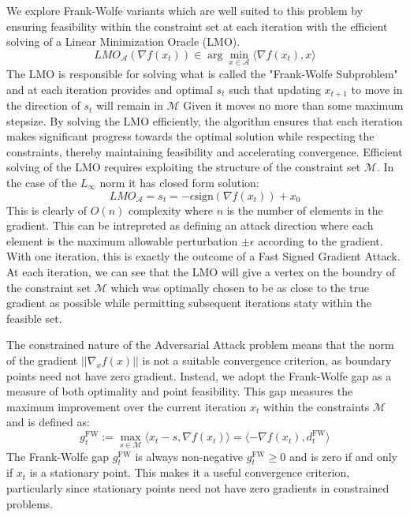 \documentclass{article}
\begin{document}
We explore Frank-Wolfe variants which are well suited to this problem by ensuring feasibility within the constraint set at each iteration with the efficient solving of a Linear Minimization Oracle (LMO). 
$$
LMO_\mathcal{A}(\nabla f(x_t)) \in \arg \min_{x \in \mathcal{A}} \langle \nabla f(x_t), x\rangle
$$
The LMO is responsible for solving what is called the "Frank-Wolfe Subproblem" and at each iteration provides and optimal $s_t$ such that updating $x_{t+1}$ to move in the direction of $s_t$ will remain in $\mathcal{M}$ Given it moves no more than some maximum stepsize. By solving the LMO efficiently, the algorithm ensures that each iteration makes significant progress towards the optimal solution while respecting the constraints, thereby maintaining feasibility and accelerating convergence. 
Efficient solving of the LMO requires exploiting the structure of the constraint set $\mathcal{M}$. In the case of the $L_\infty$ norm it has closed form solution:
$$LMO_\mathcal{A} = s_t = -\epsilon \text{sign}(\nabla f(x_t)) + x_0$$
This is clearly of $O(n)$ complexity where $n$ is the number of elements in the gradient. This can be intrepreted as defining an attack direction where each element is the maximum allowable perturbation $\pm \epsilon$ according to the gradient. With one iteration, this is exactly the outcome of a Fast Signed Gradient Attack. At each iteration, we can see that the LMO will give a vertex on the boundry of the constraint set $\mathcal{M}$ which was optimally chosen to be as close to the true gradient as possible while permitting subsequent iterations staty within the feasible set.


The constrained nature of the Adversarial Attack problem means that the norm of the gradient $||\nabla_x f(x)||$ is not a suitable convergence criterion, as boundary points need not have zero gradient. Instead, we adopt the Frank-Wolfe gap as a measure of both optimality and point feasibility. This gap measures the maximum improvement over the current iteration $x_t$ within the constraints $\mathcal{M}$ and is defined as:
$$g_t^{\text{FW}} := \max_{s \in \mathcal{M}} \langle x_t - s, \nabla f(x_t) \rangle = \langle -\nabla f(x_t), d_t^{\text{FW}} \rangle$$
The Frank-Wolfe gap $g_t^{\text{FW}}$ is always non-negative $g_t^{\text{FW}} \geq 0$ and is zero if and only if $x_t$ is a stationary point. This makes it a useful convergence criterion, particularly since stationary points need not have zero gradients in constrained problems.
\end{document}
